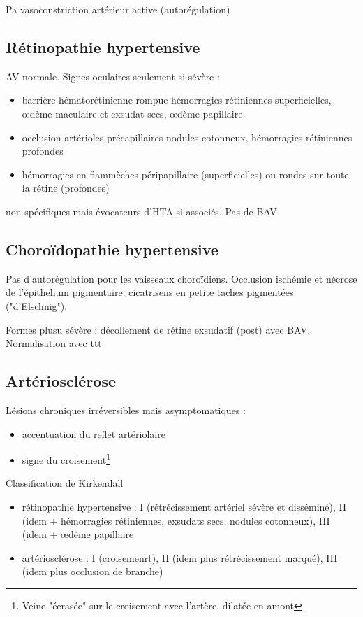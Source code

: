 \documentclass[11pt]{article}
\begin{document}
\ic Pa \thus vasoconstriction artérieur active (autorégulation)

\subsection{Rétinopathie hypertensive}
\label{sec:org8be64d7}
AV normale. Signes oculaires seulement si sévère :
\begin{itemize}
\item barrière hématorétinienne rompue \thus hémorragies rétiniennes superficielles,
\oe{}dème maculaire et exsudat secs, \oe{}dème papillaire
\item occlusion artérioles précapillaires \thus nodules cotonneux, hémorragies
rétiniennes profondes
\item hémorragies en flammèches péripapillaire (superficielles) ou rondes sur toute
la rétine (profondes)
\end{itemize}
\thus non spécifiques mais évocateurs d'HTA si associés. Pas de BAV

\subsection{Choroïdopathie hypertensive}
\label{sec:orgb94d968}
Pas d'autorégulation pour les vaisseaux choroïdiens. Occlusion \thus ischémie et
nécrose de l'épithelium pigmentaire. cicatrisens en petite taches pigmentées
("d'Elschnig").

Formes plusu sévère : décollement de rétine exsudatif (post) avec
BAV. Normalisation avec ttt

\subsection{Artériosclérose}
\label{sec:org3a174fd}
Lésions chroniques irréversibles mais asymptomatiques :
\begin{itemize}
\item accentuation du reflet artériolaire
\item signe du croisement\footnote{Veine "écrasée" sur le croisement avec l'artère, dilatée en amont}
\end{itemize}


Classification de Kirkendall 
\begin{itemize}
\item rétinopathie hypertensive : I (rétrécissement artériel sévère et disséminé),
II (idem + hémorragies rétiniennes, exsudats secs, nodules cotonneux), III
(idem + \oe{}dème papillaire
\item artériosclérose : I (croisemenrt), II (idem plus rétrécissement marqué), III
(idem plus occlusion de branche)
\end{itemize}
\end{document}
